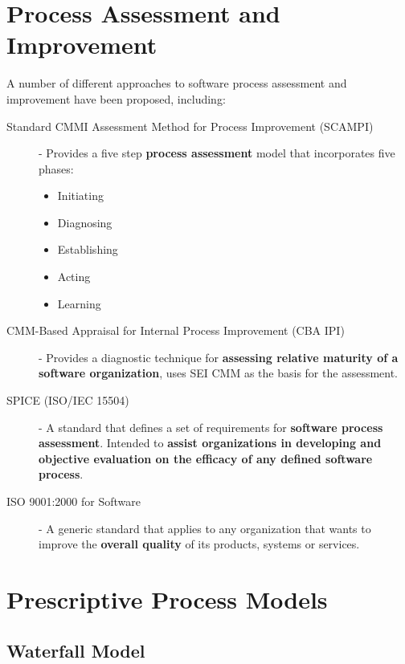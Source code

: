 \documentclass[12pt letter]{report}
\begin{document}
\section{Process Assessment and Improvement}
A number of different approaches to software process assessment and improvement have been proposed, including:
\begin{description}
  \item[Standard CMMI Assessment Method for Process Improvement (SCAMPI)]  - Provides a five step \textbf{process assessment} model that incorporates five phases:
        \begin{itemize}
          \item Initiating
          \item Diagnosing
          \item Establishing
          \item Acting
          \item Learning
        \end{itemize}

  \item[CMM-Based Appraisal for Internal Process Improvement (CBA IPI)] - Provides a diagnostic technique for \textbf{assessing relative maturity of a software organization}, uses SEI CMM as the basis for the assessment.

  \item[SPICE (ISO/IEC 15504)] - A standard that defines a set of requirements for \textbf{software process assessment}. Intended to \textbf{assist organizations in developing and objective evaluation on the efficacy of any defined software process}.

  \item[ISO 9001:2000 for Software] - A generic standard that applies to any organization that wants to improve the \textbf{overall quality} of its products, systems or services.
\end{description}

\section{Prescriptive Process Models}


\subsection{Waterfall Model}
\end{document}

